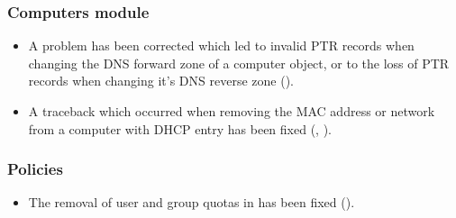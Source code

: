 
\subsubsection{Computers module}
\begin{itemize}
\item A problem has been corrected which led to invalid PTR records when
  changing the DNS forward zone of a computer object, or to the loss of PTR
  records when changing it's DNS reverse zone ().
\item A traceback which occurred when removing the MAC address or network from
  a computer with DHCP entry has been fixed (, ).
\end{itemize}

\subsubsection{Policies}
\begin{itemize}

\item The removal of user and group quotas in 
has been fixed ().

\end{itemize}




